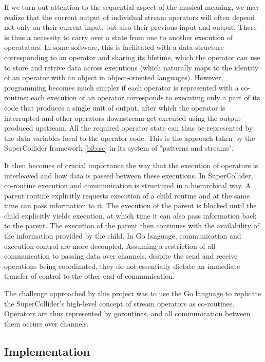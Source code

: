 \documentclass {article}
\begin{document}
If we turn out attention to the sequential aspect of the musical meaning, we may realize that the current output of individual stream operators will often depend not only on their current input, but also their previous input and output. There is thus a necessity to carry over a state from one to another execution of operatators. In some software, this is facilitated with a data structure corresponding to an operator and sharing its lifetime, which the operator can use to store and retrive data across executions (which naturally maps to the identity of an operator with an object in object-oriented languages). However, programming becomes much simpler if each operator is represented with a co-routine: each execution of an operator corresponds to executing only a part of its code that produces a single unit of output, after which the operator is interrupted and other operators downstream get executed using the output produced upstream. All the required operator state can thus be represented by the data variables local to the operator code. This is the approach taken by the SuperCollider framework \ref{bib:sc} in its system of "patterns and streams".

It then becomes of crucial importance the way that the execution of operators is interleaved and how data is passed between these executions. In SuperCollider, co-routine execution and communication is structured in a hierarchical way. A parent routine explicitly requests execution of a child routine and at the same time can pass information to it. The execution of the parent is blocked until the child explicitly yields execution, at which time it can also pass information back to the parent. The execution of the parent then continues with the availability of the information provided by the child. In Go language, communication and execution control are more decoupled. Assuming a restriction of all communcation to passing data over channels, despite the send and receive operations being coordinated, they do not essentially dictate an immediate transfer of control to the other end of communication.

The challenge approached by this project was to use the Go language to replicate the SuperCollider's high-level concept of stream operators as co-routines. Operators are thus represented by goroutines, and all communication between them occurs over channels.

\subsection{Implementation}
\end{document}
